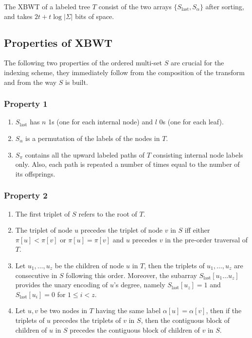 \begin{theorem}
    The XBWT of a labeled tree $T$ consist of the two arrays $\{S_{\text{last}}, S_{\alpha}\}$ after sorting, and takes $2t + t \log |\Sigma|$ bits of space. 
\end{theorem}

\subsection{Properties of XBWT}
The following two properties of the ordered multi-set $S$ are crucial for the indexing scheme, they immediately follow from the composition of the transform and from the way $S$ is built.

\subsubsection{Property 1} \label{prop1}
\begin{enumerate}
    \item $S_{\text{last}}$ has $n$ 1s (one for each internal node) and $l$ 0s (one for each leaf).
    \item $S_{\alpha}$ is a permutation of the labels of the nodes in $T$.
    \item $S_{\pi}$ contains all the upward labeled paths of $T$ consisting internal node labels only. Also, each path is repeated a number of times equal to the number of its offsprings.
\end{enumerate}

\subsubsection{Property 2} \label{prop2}
\begin{enumerate}
    \item The first triplet of $S$ refers to the root of $T$.
    \item The triplet of node $u$ precedes the triplet of node $v$ in $S$ iff either $\pi[u] < \pi[v]$ or $\pi[u] = \pi[v]$ and $u$ precedes $v$ in the pre-order traversal of $T$.
    \item Let $u_1, \dots, u_z$ be the children of node $u$ in $T$, then the triplets of $u_1, \dots, u_z$ are consecutive in $S$ following this order. Moreover, the subarray $S_{\text{last}}[u_1 \dots u_z]$ provides the unary encoding of $u$'s degree, namely $S_{\text{last}}[u_z] = 1$ and $S_{\text{last}}[u_i] = 0$ for $1 \leq i < z$.
    \item Let $u, v$ be two nodes in $T$ having the same label $\alpha[u] = \alpha[v]$, then if the triplets of $u$ precedes the triplets of $v$ in $S$, then the contiguous block of children of $u$ in $S$ precedes the contiguous block of children of $v$ in $S$. 
\end{enumerate}

